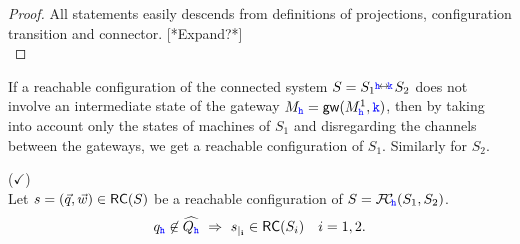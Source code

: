 \begin{proof}
All statements easily
descends from definitions of projections, configuration transition and connector.
[*Expand?*]\\
\end{proof}



If a reachable configuration of the connected system $S={S_{1}}\stackrel{\hspace{-3pt}{ \ensuremath{\mathtt{\color{blue}{ {h}}}} }\!\leftrightarrow\!{\mathtt{\color{blue}{ {k}}}}\!}{} {S_{2}}$ does not involve an intermediate state of the gateway
$M_{\mathtt{\color{blue}{ {h}}}} = \mathsf{gw}(M^1_{\mathtt{\color{blue}{ {h}}}}, {\mathtt{\color{blue}{ {k}}}})$, %
then by taking into account only the states of machines of $S_1$ and disregarding
the channels between the gateways, %
we get a
reachable configuration of $S_1$. Similarly for $S_2$.

\begin{lemma}($\checkmark$)
\label{lem:nohatrestrict}\hfill\\
Let $s= (\vec{q},\vec{w}) \in \mathsf{RC}(S)$ be a reachable configuration of 
$S ={\mathcal{F}\!\mathcal{C}}_{\!{\mathtt{\color{blue}{ {h}}}}}(S_1,S_2)$.
$${q}_{\mathtt{\color{blue}{ {h}}}}\not\in\widehat{Q_{\mathtt{\color{blue}{ {h}}}}} ~\Rightarrow~ 
{s}_{\mid_{\mathbf{i}}}\in \mathsf{RC}(S_i) \quad i=1,2.$$
\end{lemma}

